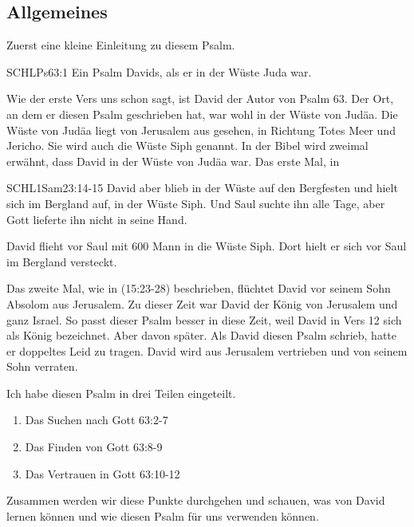 \documentclass[14pt]{../../inc/mybib}
\begin{document}
    \subsection*{Allgemeines}
    \begin{block}[Allgemeines]
    Zuerst eine kleine Einleitung zu diesem Psalm.
        \begin{bibelbox}{SCHL}{Ps}{63:1}
            Ein Psalm Davids, als er in der Wüste Juda war.
        \end{bibelbox}
    Wie der erste Vers uns schon sagt, ist David der Autor von Psalm 63. Der Ort, an dem er diesen Psalm geschrieben hat, war wohl in der Wüste von Judäa. Die Wüste von Judäa liegt von Jerusalem aus gesehen, in Richtung Totes Meer und Jericho. Sie wird auch die Wüste Siph genannt. In der Bibel wird zweimal erwähnt, dass David in der Wüste von Judäa war. Das erste Mal, in     
    \begin{bibelbox}{SCHL}{1Sam}{23:14-15}
        David aber blieb in der Wüste auf den Bergfesten und hielt sich im Bergland auf, in der Wüste Siph. Und Saul suchte ihn alle Tage, aber Gott lieferte ihn nicht in seine Hand.
    \end{bibelbox}    
    David flieht vor Saul mit 600 Mann in die Wüste Siph. Dort hielt er sich vor Saul im Bergland versteckt.
    
    Das zweite Mal, wie in (15:23-28) beschrieben, flüchtet David vor seinem Sohn Absolom aus Jerusalem. Zu dieser Zeit war David der König von Jerusalem und ganz Israel. So passt dieser Psalm besser in diese Zeit, weil David in Vers 12 sich als König bezeichnet. Aber davon später. Als David diesen Psalm schrieb, hatte er doppeltes Leid zu tragen. David wird aus Jerusalem vertrieben und von seinem Sohn verraten.
    \end{block}
    \begin{block}
        Ich habe diesen Psalm in drei Teilen eingeteilt. 
        \begin{enumerate}
            \item Das Suchen nach Gott  {63:2-7}
            \item Das Finden von Gott  {63:8-9}
            \item Das Vertrauen in Gott  {63:10-12}
        \end{enumerate}
        Zusammen werden wir diese Punkte durchgehen und schauen, was  von David lernen können und wie  diesen Psalm für uns verwenden können.
    \end{block}
\end{document}
